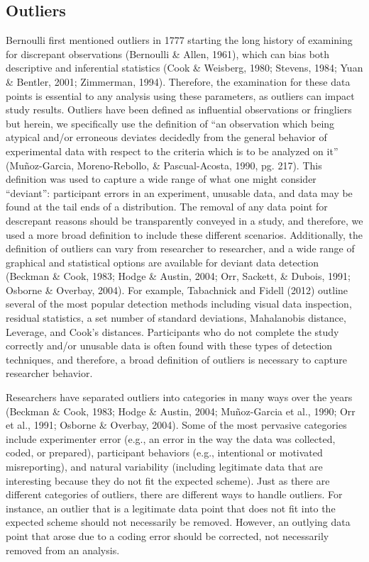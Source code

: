 \documentclass[english,,man]{apa6}
\begin{document}
\hypertarget{outliers}{%
\subsection{Outliers}\label{outliers}}

Bernoulli first mentioned outliers in 1777 starting the long history of examining for discrepant observations (Bernoulli \& Allen, 1961), which can bias both descriptive and inferential statistics (Cook \& Weisberg, 1980; Stevens, 1984; Yuan \& Bentler, 2001; Zimmerman, 1994). Therefore, the examination for these data points is essential to any analysis using these parameters, as outliers can impact study results. Outliers have been defined as influential observations or fringliers but herein, we specifically use the definition of \enquote{an observation which being atypical and/or erroneous deviates decidedly from the general behavior of experimental data with respect to the criteria which is to be analyzed on it} (Muñoz-Garcia, Moreno-Rebollo, \& Pascual-Acosta, 1990, pg. 217). This definition was used to capture a wide range of what one might consider \enquote{deviant}: participant errors in an experiment, unusable data, and data may be found at the tail ends of a distribution. The removal of any data point for descrepant reasons should be transparently conveyed in a study, and therefore, we used a more broad definition to include these different scenarios. Additionally, the definition of outliers can vary from researcher to researcher, and a wide range of graphical and statistical options are available for deviant data detection (Beckman \& Cook, 1983; Hodge \& Austin, 2004; Orr, Sackett, \& Dubois, 1991; Osborne \& Overbay, 2004). For example, Tabachnick and Fidell (2012) outline several of the most popular detection methods including visual data inspection, residual statistics, a set number of standard deviations, Mahalanobis distance, Leverage, and Cook's distances. Participants who do not complete the study correctly and/or unusable data is often found with these types of detection techniques, and therefore, a broad definition of outliers is necessary to capture researcher behavior.

Researchers have separated outliers into categories in many ways over the years (Beckman \& Cook, 1983; Hodge \& Austin, 2004; Muñoz-Garcia et al., 1990; Orr et al., 1991; Osborne \& Overbay, 2004). Some of the most pervasive categories include experimenter error (e.g., an error in the way the data was collected, coded, or prepared), participant behaviors (e.g., intentional or motivated misreporting), and natural variability (including legitimate data that are interesting because they do not fit the expected scheme). Just as there are different categories of outliers, there are different ways to handle outliers. For instance, an outlier that is a legitimate data point that does not fit into the expected scheme should not necessarily be removed. However, an outlying data point that arose due to a coding error should be corrected, not necessarily removed from an analysis.
\end{document}
